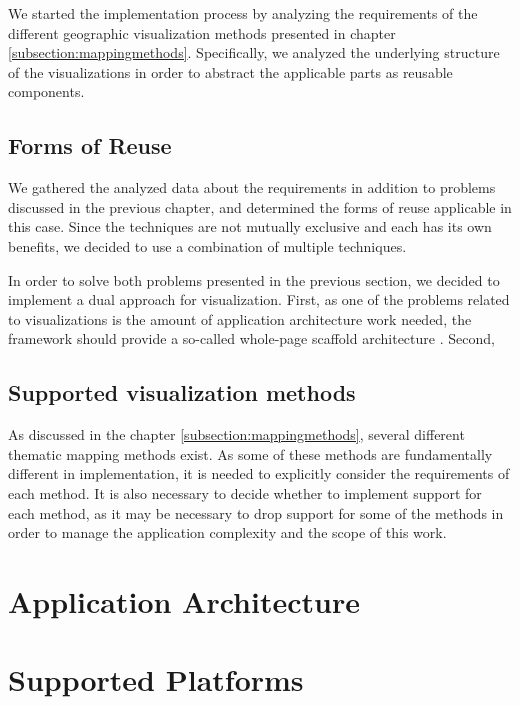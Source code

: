 We started the implementation process by analyzing the requirements of the different geographic visualization methods presented in chapter \ref{subsection:mappingmethods}. Specifically, we analyzed the underlying structure of the visualizations in order to abstract the applicable parts as reusable components.

\subsection{Forms of Reuse}

We gathered the analyzed data about the requirements in addition to problems discussed in the previous chapter, and determined the forms of reuse applicable in this case. Since the techniques are not mutually exclusive and each has its own benefits, we decided to use a combination of multiple techniques. 

In order to solve both problems presented in the previous section, we decided to implement a dual approach for visualization. First, as one of the problems related to visualizations is the amount of application architecture work needed, the framework should provide a so-called whole-page scaffold architecture \citep{jazayeri_trends_2007}. Second, 

\subsection{Supported visualization methods}

As discussed in the chapter \ref{subsection:mappingmethods}, several different thematic mapping methods exist. As some of these methods are fundamentally different in implementation, it is needed to explicitly consider the requirements of each method. It is also necessary to decide whether to implement support for each method, as it may be necessary to drop support for some of the methods in order to manage the application complexity and the scope of this work.

\section{Application Architecture}

\section{Supported Platforms}


